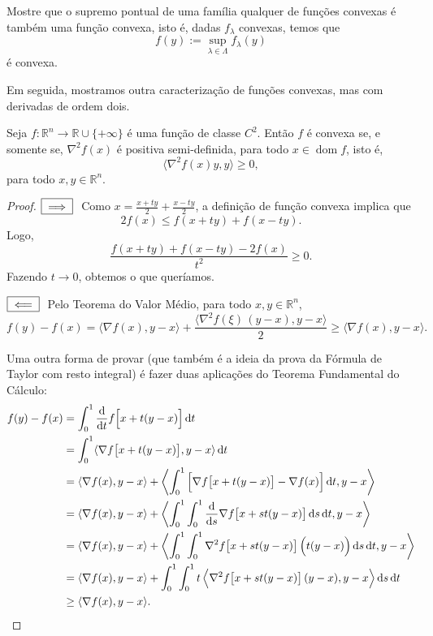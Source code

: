 \begin{exer}
	Mostre que o supremo pontual de uma família qualquer de funções convexas é também uma função convexa, isto é, dadas $f_\lambda$ convexas, temos que 
	\[
	f(y) := \sup_{\lambda \in \Lambda} f_\lambda (y)
	\] é convexa.
\end{exer}

Em seguida, mostramos outra caracterização de funções convexas, mas com derivadas de ordem dois.

\begin{prop}\label{thm:convex-hessian}
	Seja $f: \mathbb{R}^n \to \mathbb{R}\cup \{+ \infty\}$ é uma função de classe $C^2$. Então $f$ é convexa se, e somente se, $\nabla^2 f (x)$ é positiva semi-definida, para todo $x \in \operatorname{dom} f$, isto é, 
	\[
	\langle \nabla^2 f (x) y , y\rangle \ge 0,
	\] para todo $x, y \in \mathbb{R}^n$.
\end{prop}

\begin{proof}
	$\boxed{\stackrel{\hspace{0.2cm}}{\implies}}\ $ Como $x = \frac{x + ty}{2} + \frac{x - ty}{2}$, a definição de função convexa implica que
	\[
	2 f(x) \le f(x + ty) + f(x-ty).
	\] Logo,
	\[
	\frac{f(x + ty) + f(x-ty) - 2 f(x)}{t^2} \ge 0.
	\] Fazendo $t \to 0$, obtemos o que queríamos.
	
	$\boxed{\stackrel{\hspace{0.2cm}}{\impliedby}}\ $ Pelo Teorema do Valor Médio, para todo $x,y \in \mathbb{R}^n$,
	\[
	f(y) - f(x) =  \langle \nabla f (x), y - x \rangle + \frac{\big\langle \nabla^2 f (\xi) \,  (y-x), y - x \big\rangle}{2} \ge \langle \nabla f (x), y - x \rangle.
	\]		
	
	Uma outra forma de provar (que também é a ideia da prova da Fórmula de Taylor com resto integral) é fazer duas aplicações do Teorema Fundamental do Cálculo:
	\[
	\begin{split}
	f(y) - f(x) & = \int_0^1 \frac{\mathrm{d} }{\mathrm{d}  t} f \Big[ x  + t(y-x) \Big] \, \mathrm{d}  t \\
	& = \int_0^1 \langle \nabla f \big[ x  + t(y-x) \big], y - x \rangle \, \mathrm{d}  t \\            
	& = \langle \nabla f (x), y - x \rangle + \left\langle \int_0^1  \Big[\nabla f \big[ x  + t(y-x)  \big] - \nabla f (x)\Big]  \, \mathrm{d}  t, y - x \right\rangle \\
	& = \langle \nabla f (x), y - x \rangle + \left\langle \int_0^1  \int_0^1 \frac{\mathrm{d} }{\mathrm{d}  s} \nabla f \big[ x  + s t(y-x)  \big] \, \mathrm{d}  s \, \mathrm{d}  t, y - x \right\rangle \\
	& = \langle \nabla f (x), y - x \rangle + \left\langle \int_0^1  \int_0^1 \nabla^2 f \big[ x  + s t(y-x)  \big] \, \Big( t (y-x) \Big) \, \mathrm{d}  s \, \mathrm{d}  t, y - x \right\rangle \\
	& = \langle \nabla f (x), y - x \rangle + \int_0^1 \int_0^1 t \, \Big\langle \nabla^2 f \big[ x  + s t(y-x)  \big] \,  (y-x), y - x \Big\rangle  \, \mathrm{d}  s \, \mathrm{d}  t \\
	& \ge \langle \nabla f (x), y - x \rangle. \qedhere
	\end{split}
	\]
\end{proof}

